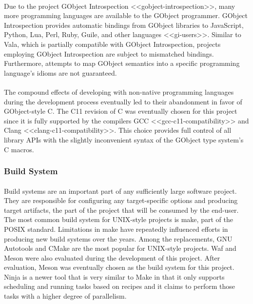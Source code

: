 \paragraph{}
Due to the project GObject Introspection <<gobject-introspection>>, many more programming languages are available to the GObject programmer.
GObject Introspection provides automatic bindings from GObject libraries to JavaScript, Python, Lua, Perl, Ruby, Guile, and other languages <<gi-users>>.
Similar to Vala, which is partially compatible with GObject Introspection, projects employing GObject Introspection are subject to mismatched bindings.
Furthermore, attempts to map GObject semantics into a specific programming language's idioms are not guaranteed.

\paragraph{}
The compound effects of developing with non-native programming languages during the development process eventually led to their abandonment in favor of GObject-style C.
The C11 revision of C was eventually chosen for this project since it is fully supported by the compilers GCC <<gcc-c11-compatibility>> and Clang <<clang-c11-compatibility>>.
This choice provides full control of all library APIs with the slightly inconvenient syntax of the GObject type system's C macros.

\subsubsection{Build System}

\paragraph{}
Build systems are an important part of any sufficiently large software project.
They are responsible for configuring any target-specific options and producing target artifacts, the part of the project that will be consumed by the end-user.
The most common build system for UNIX-style projects is make, part of the POSIX standard.
Limitations in make have repeatedly influenced efforts in producing new build systems over the years.
Among the replacements, GNU Autotools and CMake are the most popular for UNIX-style projects.
Waf and Meson were also evaluated during the development of this project.
After evaluation, Meson was eventually chosen as the build system for this project.
Ninja is a newer tool that is very similar to Make in that it only supports scheduling and running tasks based on recipes and it claims to perform those tasks with a higher degree of parallelism.

